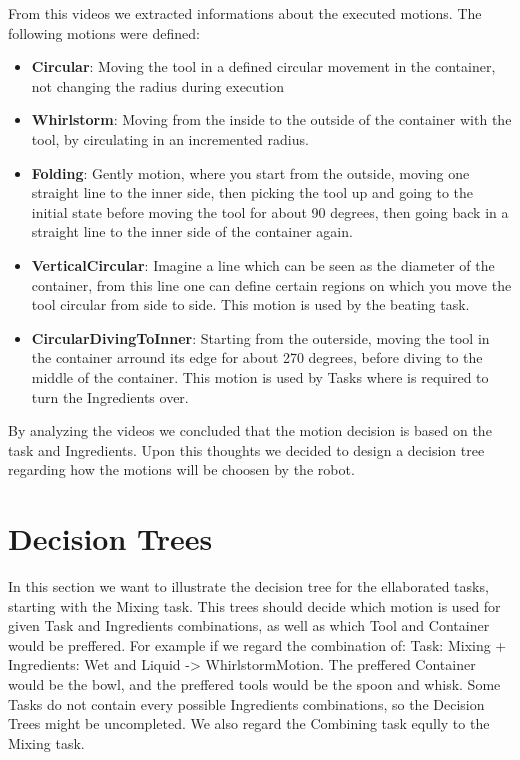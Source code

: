 	From this videos we extracted informations about the executed motions. The following motions were defined:
	\begin{itemize}
		\item \textbf{Circular}: Moving the tool in a defined circular movement in the container, not changing the radius during execution
		\item \textbf{Whirlstorm}: Moving from the inside to the outside of the container with the tool, by circulating in an incremented radius.
		\item \textbf{Folding}: Gently motion, where you start from the outside, moving one straight line to the inner side, then picking the tool up and going to the initial state before moving the tool for about 90 degrees, then going back in a straight line to the inner side of the container again.
		\item \textbf{VerticalCircular}: Imagine a line which can be seen as the diameter of the container, from this line one can define certain regions on which you move the tool circular from side to side. This motion is used by the beating task.
		\item \textbf{CircularDivingToInner}: Starting from the outerside, moving the tool in the container arround its edge for about 270 degrees, before diving to the middle of the container. This motion is used by Tasks where is required to turn the Ingredients over.
	\end{itemize}

	By analyzing the videos we concluded that the motion decision is based on the task and Ingredients. Upon this thoughts we decided to design a decision tree regarding how the motions will be choosen by the robot.
\newpage
\section*{Decision Trees}
In this section we want to illustrate the decision tree for the ellaborated tasks, starting with the Mixing task.
This trees should decide which motion is used for given Task and Ingredients combinations, as well as which Tool and Container would be preffered.
For example if we regard the combination of: \newline Task: Mixing + Ingredients: Wet and Liquid -> WhirlstormMotion. The preffered Container would be the bowl, and the preffered tools would be the spoon and whisk.
Some Tasks do not contain every possible Ingredients combinations, so the Decision Trees might be uncompleted. We also regard the Combining task eqully to the Mixing task.

